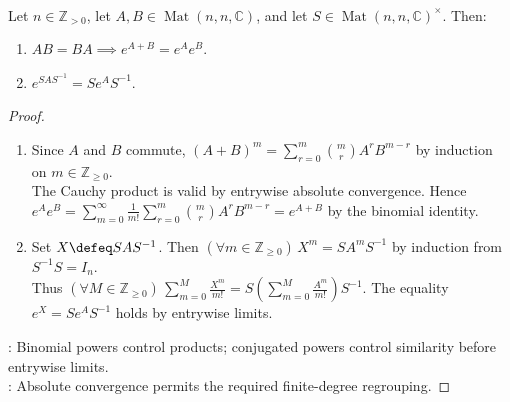 \begin{proposition} \label{prop:matrix-exponential-commuting-similarity-laws} \\
Let $n\in\mathbb{Z}_{>0}$, let $A,B\in\operatorname{Mat}(n,n,\mathbb{C})$, and let $S\in\operatorname{Mat}(n,n,\mathbb{C})^{\times}$. Then:
\begin{enumerate}[label=(\roman*)]
\setlength{\itemsep}{0pt}
\item $AB=BA\implies e^{A+B}=e^Ae^B$.
\item $e^{SAS^{-1}}=Se^AS^{-1}$.
\end{enumerate}
\begin{proof}
\begin{enumerate}[label=(\roman*)]
\setlength{\itemsep}{0pt}
\item Since $A$ and $B$ commute, $(A+B)^m=\sum\limits_{r=0}^m\binom{m}{r}A^rB^{m-r}$ by induction on $m\in\mathbb{Z}_{\geq0}$.\\
The Cauchy product is valid by entrywise absolute convergence. Hence $e^Ae^B=\sum\limits_{m=0}^{\infty}\frac{1}{m!}\sum\limits_{r=0}^m\binom{m}{r}A^rB^{m-r}=e^{A+B}$ by the binomial identity.
\item Set $X\defeq SAS^{-1}$. Then $(\forall m\in\mathbb{Z}_{\geq0})\,X^m=SA^mS^{-1}$ by induction from $S^{-1}S=I_n$.\\
Thus $(\forall M\in\mathbb{Z}_{\geq0})\,\sum\limits_{m=0}^{M}\frac{X^m}{m!}=S\left(\sum\limits_{m=0}^{M}\frac{A^m}{m!}\right)S^{-1}$. The equality $e^X=Se^AS^{-1}$ holds by entrywise limits.
\end{enumerate}
: Binomial powers control products; conjugated powers control similarity before entrywise limits.\\
: Absolute convergence permits the required finite-degree regrouping.
\end{proof}
\end{proposition}

